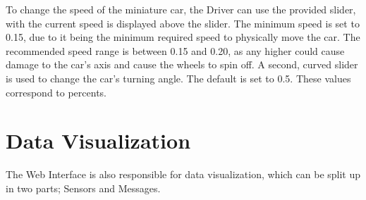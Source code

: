 \documentclass[12pt]{article}
\begin{document}
To change the speed of the miniature car, the Driver can use the provided slider, with the current speed is displayed above the slider. The minimum speed is set to 0.15, due to it being the minimum required speed to physically move the car. The recommended speed range is between 0.15 and 0.20, as any higher could cause damage to the car's axis and cause the wheels to spin off. A second, curved slider is used to change the car's turning angle. The default is set to 0.5. These values correspond to percents.

\section{Data Visualization}
The Web Interface is also responsible for data visualization, which can be split up in two parts; Sensors and Messages.

\end{document}
